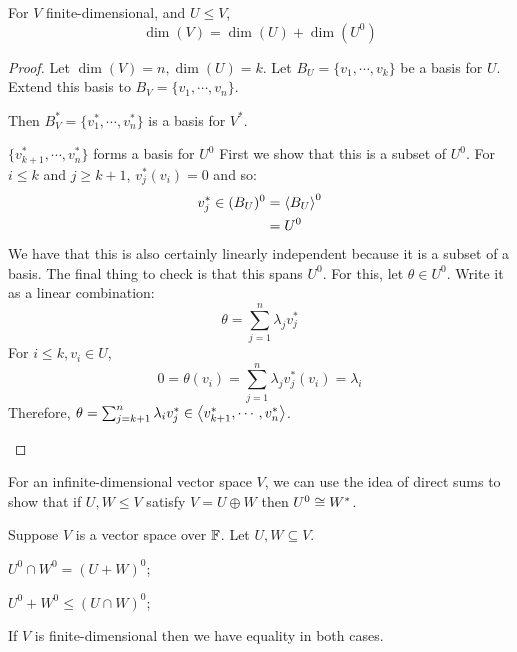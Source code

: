 \documentclass[../Main.tex]{subfiles}
\begin{document}
\begin{proposition}
    For $V$ finite-dimensional, and $U \leq V$,
    \begin{equation*}
        \dim(V) = \dim(U) + \dim(U^0)
    \end{equation*}
    \label{propAnnihilatorDim}
\end{proposition}
\begin{proof}
    Let $\dim(V) = n, \dim(U) = k$.
    Let $B_U = \{v_1, \cdots, v_k\}$ be a basis for $U$. Extend this basis to $B_V = \{v_1, \cdots, v_n\}$.

    Then $B_V^* = \{v_1^*, \cdots, v_n^*\}$ is a basis for $V^*$.
    \begin{subproof}{$\{v_{k+1}^*, \cdots, v_n^*\}$ forms a basis for $U^0$}
        First we show that this is a subset of $U^0$. For $i \leq k$ and $j \geq k+1$, $v_j^*(v_i) = 0$ and so:
        \begin{align*}
            v_j^* \in (B_U)^0 &= \left\langle B_U \right\rangle^0 \\
            &= U^0
        \end{align*}
        We have that this is also certainly linearly independent because it is a subset of a basis. The final thing to check is that this spans $U^0$. For this, let $\theta \in U^0$. Write it as a linear combination:
        \begin{equation*}
            \theta = \sum_{j=1}^n \lambda_j v_j^*
        \end{equation*}
        For $i \leq k, v_i \in U$,
        \begin{equation*}
            0 = \theta(v_i) = \sum_{j=1}^{n} \lambda_j v_j^*(v_i) = \lambda_i
        \end{equation*}
        Therefore, $\theta = \sum_{j = k + 1}^{n} \lambda_i v_j^* \in \left\langle v_{k+1}^*, \cdots, v_n^* \right\rangle$.
    \end{subproof}
\end{proof}
\begin{remark}
    For an infinite-dimensional vector space $V$, we can use the idea of direct sums to show that if $U, W \leq V$ satisfy $V = U \oplus W$ then $U^0 \cong W^*$.
\end{remark}
\begin{propositions}{
        Suppose $V$ is a vector space over $\mathbb{F}$. Let $U, W \subseteq V$.
        \label{propsAnnihilatorSubsets}
    }
    \item $U^0 \cap W^0 = (U + W)^0$;
    \item $U^0 + W^0 \leq (U \cap W)^0$;
    \item If $V$ is finite-dimensional then we have equality in both cases.
\end{propositions}
\end{document}
